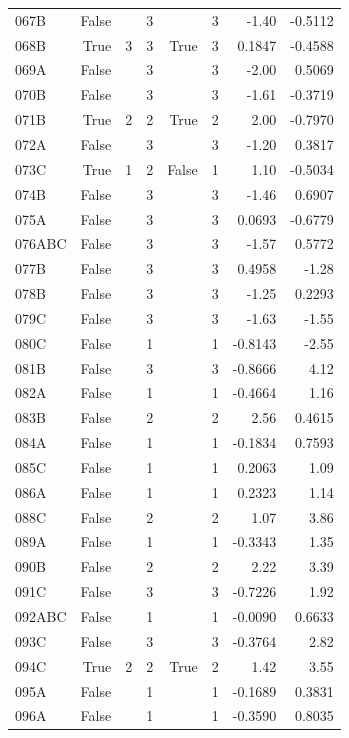 {\begin{longtable}{lrrrrrrr}
  067B & False &  & 3 &  & 3 & -1.40 & -0.5112 \\
  068B & True & 3 & 3 & True & 3 & 0.1847 & -0.4588 \\
  069A & False &  & 3 &  & 3 & -2.00 & 0.5069 \\
  070B & False &  & 3 &  & 3 & -1.61 & -0.3719 \\
  071B & True & 2 & 2 & True & 2 & 2.00 & -0.7970 \\
  072A & False &  & 3 &  & 3 & -1.20 & 0.3817 \\
  073C & True & 1 & 2 & False & 1 & 1.10 & -0.5034 \\
  074B & False &  & 3 &  & 3 & -1.46 & 0.6907 \\
  075A & False &  & 3 &  & 3 & 0.0693 & -0.6779 \\
  076ABC & False &  & 3 &  & 3 & -1.57 & 0.5772 \\
  077B & False &  & 3 &  & 3 & 0.4958 & -1.28 \\
  078B & False &  & 3 &  & 3 & -1.25 & 0.2293 \\
  079C & False &  & 3 &  & 3 & -1.63 & -1.55 \\
  080C & False &  & 1 &  & 1 & -0.8143 & -2.55 \\
  081B & False &  & 3 &  & 3 & -0.8666 & 4.12 \\
  082A & False &  & 1 &  & 1 & -0.4664 & 1.16 \\
  083B & False &  & 2 &  & 2 & 2.56 & 0.4615 \\
  084A & False &  & 1 &  & 1 & -0.1834 & 0.7593 \\
  085C & False &  & 1 &  & 1 & 0.2063 & 1.09 \\
  086A & False &  & 1 &  & 1 & 0.2323 & 1.14 \\
  088C & False &  & 2 &  & 2 & 1.07 & 3.86 \\
  089A & False &  & 1 &  & 1 & -0.3343 & 1.35 \\
  090B & False &  & 2 &  & 2 & 2.22 & 3.39 \\
  091C & False &  & 3 &  & 3 & -0.7226 & 1.92 \\
  092ABC & False &  & 1 &  & 1 & -0.0090 & 0.6633 \\
  093C & False &  & 3 &  & 3 & -0.3764 & 2.82 \\
  094C & True & 2 & 2 & True & 2 & 1.42 & 3.55 \\
  095A & False &  & 1 &  & 1 & -0.1689 & 0.3831 \\
  096A & False &  & 1 &  & 1 & -0.3590 & 0.8035 \\

\end{longtable}}
